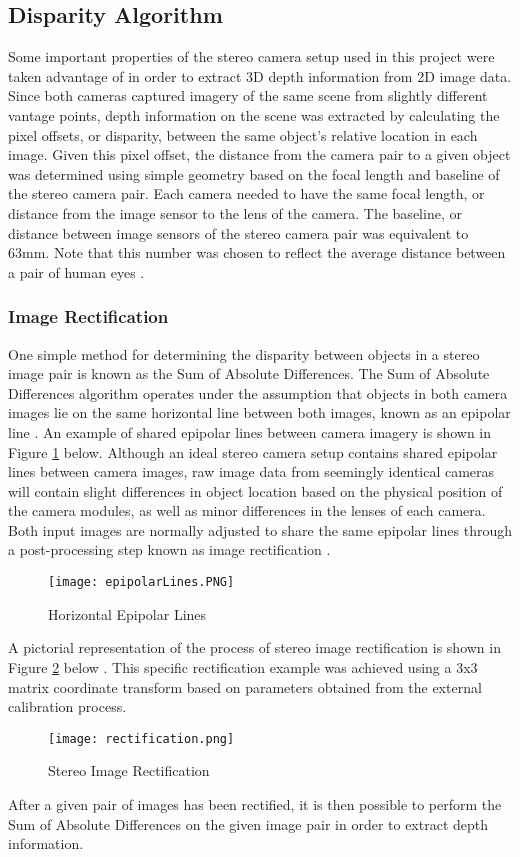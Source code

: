 \subsection{Disparity Algorithm}
Some important properties of the stereo camera setup used in this project were taken advantage of in order to extract 3D depth information from 2D image data. Since both cameras captured imagery of the same scene from slightly different vantage points, depth information on the scene was extracted by calculating the pixel offsets, or disparity, between the same object's relative location in each image. Given this pixel offset, the distance from the camera pair to a given object was determined using simple geometry based on the focal length and baseline of the stereo camera pair. Each camera needed to have the same focal length, or distance from the image sensor to the lens of the camera. The baseline, or distance between image sensors of the stereo camera pair was equivalent to 63mm. Note that this number was chosen to reflect the average distance between a pair of human eyes \cite{collins}. 
\subsubsection{Image Rectification} \label{rectsec}
One simple method for determining the disparity between objects in a stereo image pair is known as the Sum of Absolute Differences. The Sum of Absolute Differences algorithm operates under the assumption that objects in both camera images lie on the same horizontal line between both images, known as an epipolar line \cite{collins}. An example of shared epipolar lines between camera imagery is shown in Figure \ref{epipolarLines} below. Although an ideal stereo camera setup contains shared epipolar lines between camera images, raw image data from seemingly identical cameras will contain slight differences in object location based on the physical position of the camera modules, as well as minor differences in the lenses of each camera. Both input images are normally adjusted to share the same epipolar lines through a post-processing step known as image rectification \cite{collins}. 
\par
\begin{figure}[H]
	\centerline{\texttt{[image: epipolarLines.PNG]}}
	\caption{Horizontal Epipolar Lines \cite{collins}}
	\label{epipolarLines}
\end{figure}
\par
A pictorial representation of the process of stereo image rectification is shown in Figure \ref{rectification} below \cite{mattoccia_slides}. This specific rectification example was achieved using a 3x3 matrix coordinate transform based on parameters obtained from the external calibration process. 
\begin{figure}[H]
	\centerline{\texttt{[image: rectification.png]}}
	\caption{Stereo Image Rectification \cite{mattoccia_slides}}
	\label{rectification}
\end{figure}
\par
After a given pair of images has been rectified, it is then possible to perform the Sum of Absolute Differences on the given image pair in order to extract depth information. 
